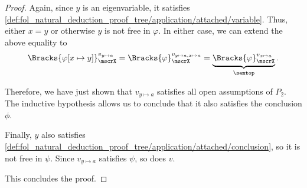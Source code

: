 \begin{proof}
  Again, since \( y \) is an eigenvariable, it satisfies \cref{def:fol_natural_deduction_proof_tree/application/attached/variable}. Thus, either \( x = y \) or otherwise \( y \) is not free in \( \varphi \). In either case, we can extend the above equality to
  \begin{equation*}
    \Bracks{\varphi[x \mapsto y]}_\mscrX^{v_{y \mapsto a}} = \Bracks{\varphi}_\mscrX^{v_{y \mapsto a, x \mapsto a}} = \underbrace{\Bracks{\varphi}_\mscrX^{v_{x \mapsto a}}}_{\semtop}.
  \end{equation*}

  Therefore, we have just shown that \( v_{y \mapsto a} \) satisfies all open assumptions of \( P_2 \). The inductive hypothesis allows us to conclude that it also satisfies the conclusion \( \phi \).

  Finally, \( y \) also satisfies \cref{def:fol_natural_deduction_proof_tree/application/attached/conclusion}, so it is not free in \( \psi \). Since \( v_{y \mapsto a} \) satisfies \( \psi \), so does \( v \).

  This concludes the proof.
\end{proof}
